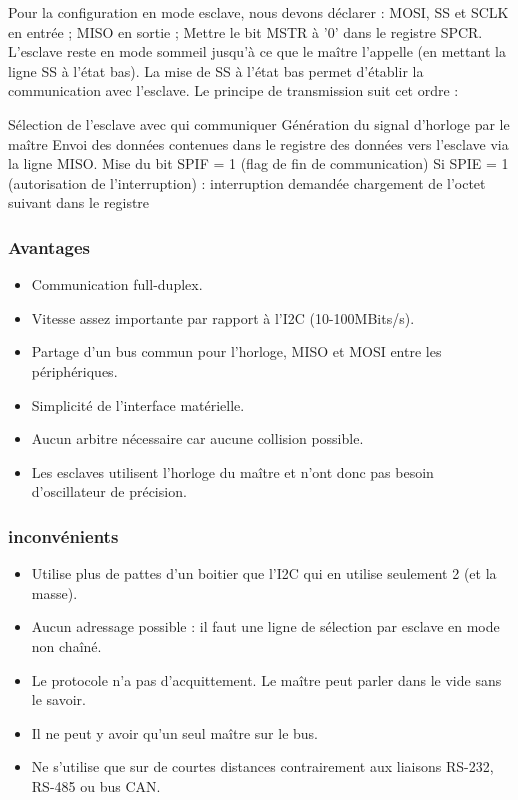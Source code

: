 \documentclass[french,a4paper,12pt]{report}
\begin{document}
  		Pour la configuration en mode esclave, nous devons déclarer : MOSI, SS et SCLK en entrée ; MISO en sortie ; Mettre le bit MSTR à '0' dans le registre SPCR. L’esclave reste en mode sommeil jusqu’à ce que le maître l'appelle (en mettant la ligne SS à l’état bas). La mise de SS à l’état bas permet d'établir la communication avec l’esclave. Le principe de transmission suit cet ordre :
 
    Sélection de l'esclave avec qui communiquer
    Génération du signal d'horloge par le maître
    Envoi des données contenues dans le registre des données vers l’esclave via la ligne MISO.
    Mise du bit SPIF = 1 (flag de fin de communication)
    Si SPIE = 1 (autorisation de l’interruption) :
        interruption demandée
        chargement de l’octet suivant dans le registre

			\subsubsection{Avantages}
 
			\begin{itemize}
			\item Communication full-duplex.
			\item Vitesse assez importante par rapport à l’I2C (10-100MBits/s).
			\item Partage d’un bus commun pour l’horloge, MISO et MOSI entre les périphériques.
			\item Simplicité de l’interface matérielle.
			\item Aucun arbitre nécessaire car aucune collision possible.
			\item Les esclaves utilisent l’horloge du maître et n’ont donc pas besoin d’oscillateur de précision.
			\end{itemize}
 
  		\subsubsection{inconvénients}
 
			\begin{itemize}
			\item Utilise plus de pattes d’un boitier que l’I2C qui en utilise seulement 2 (et la masse).
			\item Aucun adressage possible : il faut une ligne de sélection par esclave en mode non chaîné.
			\item Le protocole n’a pas d’acquittement. Le maître peut parler dans le vide sans le savoir.
			\item Il ne peut y avoir qu’un seul maître sur le bus.
			\item Ne s’utilise que sur de courtes distances contrairement aux liaisons RS-232, RS-485 ou bus CAN.
			\end{itemize}
 
\end{document}
